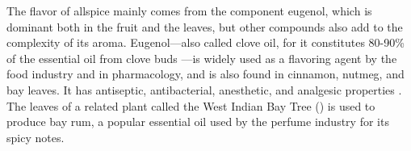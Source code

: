 The flavor of allspice mainly comes from the component eugenol, which is dominant both in the fruit and the leaves, but other compounds also add to the complexity of its aroma. Eugenol---also called clove oil, for it constitutes 80-90\% of the essential oil from clove buds \autocite[166]{barnes_herbal_2007}---is widely used as a flavoring agent by the food industry and in pharmacology, and is also found in cinnamon, nutmeg, and bay leaves. It has antiseptic, antibacterial, anesthetic, and analgesic properties \autocite{ulanowska_biological_2021}. The leaves of a related plant called the West Indian Bay Tree () is used to produce bay rum, a popular essential oil used by the perfume industry for its spicy notes. 







